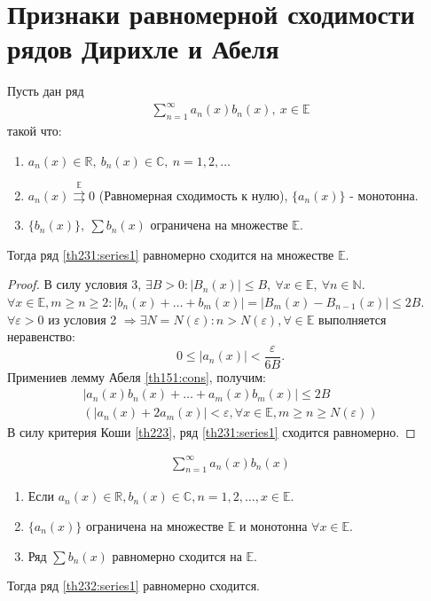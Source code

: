 \section{Признаки равномерной сходимости рядов Дирихле и Абеля}
\begin{theorem}
  Пусть дан ряд
  \begin{gather}
    \sum\limits_{n = 1}^{\infty} a_n(x) b_n(x), \ x \in \mathbb{E} \label{th231:series1}
  \end{gather}
  такой что:
  \begin{enumerate}
    \item $a_n(x) \in \mathbb{R}, \ b_n(x) \in \mathbb{C}, \ n = 1, 2, \dots$
    \item $a_n(x) \stackrel{\mathrm{\mathbb{E}}}{\rightrightarrows} 0$
      (Равномерная сходимость к нулю), $\{a_n(x)\}$ - монотонна.
    \item $\{b_n(x)\}, \ \sum b_n(x)$ ограничена на множестве $\mathbb{E}$.
  \end{enumerate}
  Тогда ряд \eqref{th231:series1} равномерно сходится на множестве $\mathbb{E}$.
\end{theorem}

\begin{proof}
  В силу условия 3, $\exists B > 0: |B_n(x)| \leq B, \ \forall x \in \mathbb{E}, \
  \forall n \in \mathbb{N}$. \\
  $\forall x \in \mathbb{E}, m \geq n \geq 2: |b_n(x) + \dots + b_m(x)| =
  |B_m(x) - B_{n-1}(x)| \leq 2B$. \\
  $\forall \varepsilon > 0$ из условия 2 $\Rightarrow \exists N = N(\varepsilon):
  n > N(\varepsilon), \forall \in \mathbb{E}$ выполняется неравенство:
  $$0 \leq |a_n(x)| < \frac{\varepsilon}{6B}.$$
  Примениев лемму Абеля \eqref{th151:cons}, получим:
  \begin{gather*}
    |a_n(x) b_n(x) + \dots + a_m(x) b_m(x)| \leq 2B \\
    (|a_n(x) + 2a_m(x)| < \varepsilon, \forall x \in \mathbb{E},
    m \geq n \geq N(\varepsilon))
  \end{gather*}
  В силу критерия Коши \eqref{th223}, ряд \eqref{th231:series1} сходится равномерно.
\end{proof}

\begin{theorem}
  \label{th232}
  \begin{gather}
    \sum\limits_{n = 1}^{\infty} a_n(x) b_n(x) \label{th232:series1}
  \end{gather}
  \begin{enumerate}
    \item Если $a_n(x) \in \mathbb{R}, b_n(x) \in \mathbb{C}, n = 1, 2, \dots,
      x \in \mathbb{E}$.
    \item $\{a_n(x)\}$ ограничена на множестве $\mathbb{E}$ и монотонна
      $\forall x \in \mathbb{E}$.
    \item Ряд $\sum b_n(x)$ равномерно сходится на $\mathbb{E}$.
  \end{enumerate}
  Тогда ряд \eqref{th232:series1} равномерно сходится.
\end{theorem}

